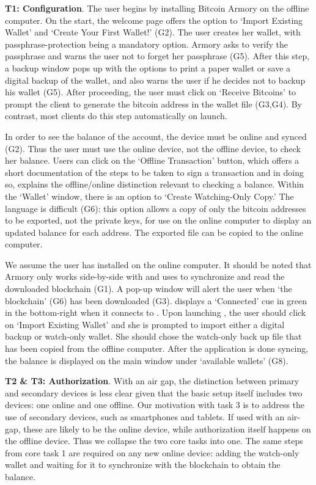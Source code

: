 \textbf{T1: Configuration}.
The user begins by installing Bitcoin Armory on the offline computer. On the start, the welcome page offers the option to `Import Existing Wallet' and `Create Your First Wallet!' (G2). The user creates her wallet, with passphrase-protection being a mandatory option. Armory asks to verify the passphrase and warns the user not to forget her passphrase (G5). After this step, a backup window pops up with the options to print a paper wallet or save a digital backup of the wallet, and also warns the user if he decides not to backup his wallet (G5). After proceeding, the user must click on `Receive Bitcoins' to prompt the client to generate the bitcoin address in the wallet file (G3,G4). By contrast, most clients do this step automatically on launch. 

In order to see the balance of the account, the device must be online and synced (G2). Thus the user must use the online device, not the offline device, to check her balance. Users can click on the `Offline Transaction' button, which offers a short documentation of the steps to be taken to sign a transaction and in doing so, explains the offline/online distinction relevant to checking a balance. Within the `Wallet' window, there is an option to `Create Watching-Only Copy.' The language is difficult (G6): this option allows a copy of only the bitcoin addresses to be exported, not the private keys, for use on the online computer to display an updated balance for each address. The exported file can be copied to the online computer.

We assume the user has installed \armory on the online computer. It should be noted that Armory only works side-by-side with \bitcoinclient and uses \bitcoinclient to synchronize and read the downloaded blockchain (G1). A pop-up window will alert the user when `the blockchain' (G6) has been downloaded (G3). \armory displays a `Connected' cue in green in the bottom-right when it connects to \bitcoinclient. Upon launching \armory, the user should click on `Import Existing Wallet' and she is prompted to import either a digital backup or watch-only wallet. She should chose the watch-only back up file that has been copied from the offline computer. After the application is done syncing, the balance is displayed on the main window under `available wallets' (G8).

\textbf{T2 \& T3: Authorization}.
With an air gap, the distinction between primary and secondary devices is less clear given that the basic setup itself includes two devices: one online and one offline. Our motivation with task 3 is to address the use of secondary devices, such as smartphones and tablets. If used with an air-gap, these are likely to be the online device, while authorization itself happens on the offline device. Thus we collapse the two core tasks into one. The same steps from core task 1 are required on any new online device: adding the watch-only wallet and waiting for it to synchronize with the blockchain to obtain the balance.

